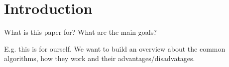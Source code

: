 \section{Introduction}

What is this paper for?
What are the main goals?

E.g.
this is for ourself. We want to build an overview about the common algorithms, how they work and their advantages/disadvatages.

\newpage